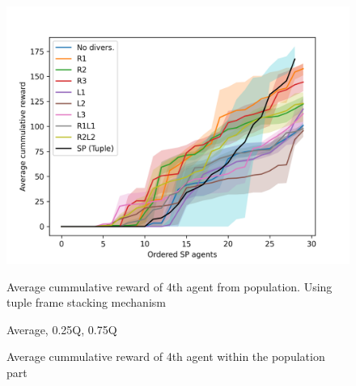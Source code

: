 \begin{figure}[!ht]
    \centering
    \includegraphics*[width=13cm]{../img/FSTuple4thOrderedAvg.png}

    \caption{Average cummulative reward of 4th agent within the population part}
    \label{FSTuple4thOrderedAvg}
    \medskip
    \small 
    Average cummulative reward of 4th agent from population.
    Using tuple frame stacking mechanism

    Average, 0.25Q, 0.75Q

\end{figure}










